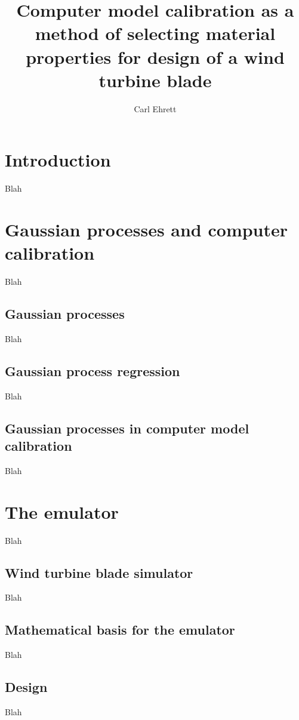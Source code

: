 \documentclass{article}
\author{Carl Ehrett}
\title{Computer model calibration as a method of selecting material properties for design of a wind turbine blade}
\begin{document}
\maketitle

\section{Introduction}
Blah

\section{Gaussian processes and computer calibration}
Blah

\subsection{Gaussian processes}
Blah

\subsection{Gaussian process regression}
Blah

\subsection{Gaussian processes in computer model calibration}
Blah

\section{The emulator}
Blah

\subsection{Wind turbine blade simulator}
Blah

\subsection{Mathematical basis for the emulator}
Blah

\subsection{Design}
Blah
\end{document}

